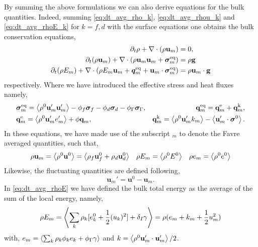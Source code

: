 By summing the above formulations we can also derive equations for the bulk quantities. 
Indeed, summing \ref{eq:dt_avg_rho_k}, \ref{eq:dt_avg_rhou_k} and \ref{eq:dt_avg_rhoE_k} for $k=f,d$ with the surface equations one obtains the bulk conservation equations, 
\begin{align}
    \label{eq:dt_avg_rho}
    \pddt \rho 
    + \div (
         \rho \textbf{u}_m
    )
    &= 
    0,\\
    \label{eq:dt_avg_rhou_m}
    \pddt ( \rho\textbf{u}_m)  
    + \div (
         \rho\textbf{u}_m\textbf{u}_m
        + \bm{\sigma}^\text{eq}_m
    )
    &= 
     \rho \textbf{g} \\
    \label{eq:dt_avg_rhoE}
    \pddt (\rho E_m)  
    + \div (
        \rho E_m \textbf{u}_m
        + \bm{q}^\text{eq}_m
        + \textbf{u}_m \cdot \bm{\sigma}^\text{eq}_m
        )
    &= 
     \rho \textbf{u}_m  \cdot \textbf{g} 
\end{align} 
respectively. 
Where we have introduced the effective stress and heat fluxes namely, 
\begin{align*}
    &\bm{\sigma}^\text{eq}_m
    = 
    \avg{ \rho^0\textbf{u}'_m\textbf{u}'_m}
      - \phi_f\bm\sigma_f
      - \phi_d\bm\sigma_d
      - \phi_\Gamma\bm\sigma_\Gamma,%
    &\textbf{q}^\text{eq}_m
    =\textbf{q}^\text{e}_m +\textbf{q}^\text{k}_m,  \\
    &\textbf{q}^\text{e}_m
    = \avg{\rho^0\textbf{u}_m' e_m'} 
    + \phi\textbf{q}_m,
    &\textbf{q}^\text{k}_m
    = \avg{\rho^0 \textbf{u}_m' k_m} 
    - \avg{ \textbf{u}_m' \cdot \bm{\sigma}^0}.
\end{align*}
In these equations, we have made use of the subscript $_m$ to denote the Favre averaged quantities, such that, 
\begin{align*}
    \rho \textbf{u}_m
    = \left<\rho^0 \textbf{u}^0\right>
    = \left<\rho_f \textbf{u}^0_f
    + \rho_d \textbf{u}_d^0\right>
    &&
    \rho E_m
    = \left<\rho^0 E^0\right>
    &&
    \rho e_m
    = \left<\rho^0 e^0\right>
\end{align*}
Likewise, the fluctuating quantities are defined following, 
\begin{equation}
    \textbf{u}_m'
    = \textbf{u}^0 - \textbf{u}_m.
\end{equation}
In \ref{eq:dt_avg_rhoE} we have defined the bulk total energy as the average of the sum of the local energy, namely, 
\begin{equation}
    \rho E_m = \left<\sum_k \rho_k [e_k^0 + \frac{1}{2}(u_k)^2] 
    + \delta_I \gamma\right>
    = \rho( e_m +  k_m + \frac{1}{2}u_m^2)
\end{equation}
with, $e_m = \left<\sum_k \rho_k\phi_k e_k + \phi_\Gamma \gamma\right>$ and $k = \left<\rho^0 \textbf{u}_m'\cdot \textbf{u}_m'\right>/2$. 

